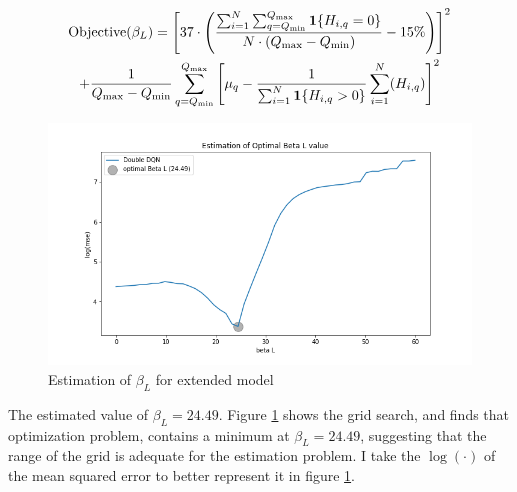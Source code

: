 \begin{multline}
   \text{Objective}(\beta_L) =  \left[ 37 \cdot \left(\frac{\sum_{i=1}^{N} \sum_{q=Q_{\min}}^{Q_{\max}} \mathbf{1}\{H_{i,q} = 0\}}{ N \cdot (Q_{\max} - Q_{\min} )} - 15\% \right) \right]^2 \\ + \frac{1}{Q_{\max} - Q_{\min}}\sum_{q=Q_{\min}}^{Q_{\max}} \left[ \mu_q - \frac{1}{\sum_{i=1}^{N} \mathbf{1}\{H_{i,q} > 0\}}\sum_{i=1}^N (H_{i,q})\right]^2
\end{multline}

\begin{figure}[ht]
    \centering
    \includegraphics[scale=0.4]{figures/ddqn_extended_model_estimation_beta_L.png}
    \caption{Estimation of $\beta_L$ for extended model}
    \label{fig:estimation_extended}
\end{figure}

The estimated value of $\beta_L = 24.49$. Figure \ref{fig:estimation_extended} shows the grid search, and finds that optimization problem, contains a minimum at $\beta_L = 24.49$, suggesting that the range of the grid is adequate for the estimation problem. I take the $\log (\cdot)$ of the mean squared error to better represent it in figure \ref{fig:estimation_extended}.